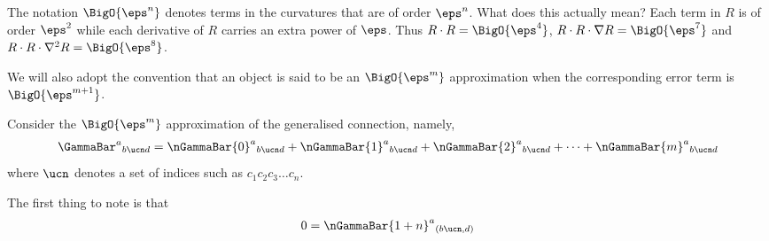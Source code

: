 \documentclass[12pt]{cdblatex}
\begin{document}
The notation $\BigO{\eps^n}$ denotes terms in the curvatures that are of order $\eps^n$. What does this actually mean?
Each term in $R$ is of order $\eps^2$ while each derivative of $R$ carries an extra power of $\eps$.
Thus $R\cdot R = \BigO{\eps^4}$, $R\cdot R\cdot\nabla R = \BigO{\eps^7}$ and $R\cdot R\cdot\nabla^2R = \BigO{\eps^8}$.

We will also adopt the convention that an object is said to be an $\BigO{\eps^{m}}$ approximation when the corresponding error term is $\BigO{\eps^{m+1}}$.

Consider the $\BigO{\eps^{m}}$ approximation of the generalised connection, namely,
\begin{align}
   \GammaBar^{a}{}_{b\ucn d}
      = \nGammaBar{0}^{a}{}_{b\ucn d}
      + \nGammaBar{1}^{a}{}_{b\ucn d}
      + \nGammaBar{2}^{a}{}_{b\ucn d}
      + \dots
      + \nGammaBar{m}^{a}{}_{b\ucn d}
\end{align}
where $\ucn$ denotes a set of indices such as $c_1c_2c_3\dots c_n$.

The first thing to note is that
\begin{align}
   0 = \nGammaBar{1+n}^{a}{}_{(b\ucn,d)}
\end{align}
\end{document}

